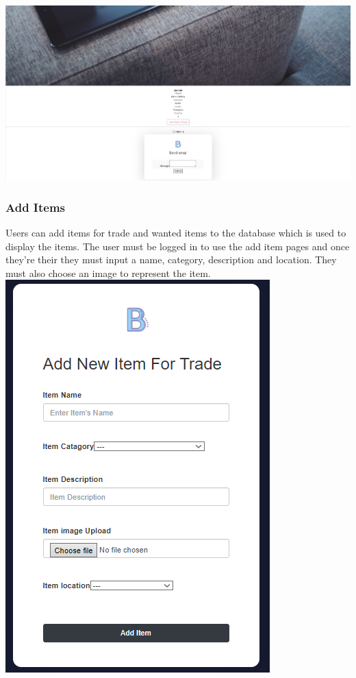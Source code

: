\includegraphics[width=\textwidth]{img/fe_itemcontact.PNG}
\subsubsection{Add Items}
Users can add items for trade and wanted items to the database which is used to display the items. The user must be logged in to use the add item pages and once they're their they must input a name, category, description and location. They must also choose an image to represent the item.
\newline
\includegraphics[scale=.6]{img/fe_additem.PNG}

